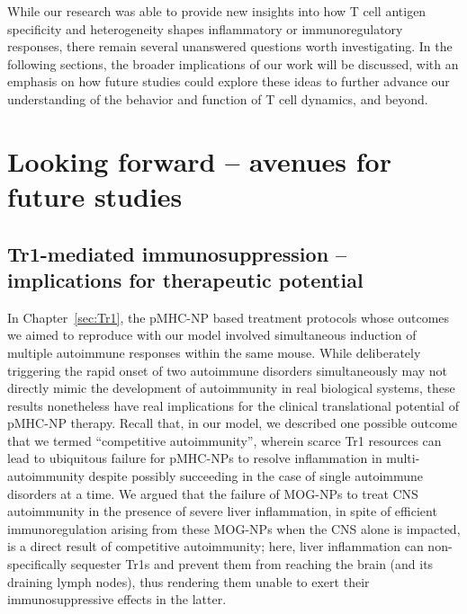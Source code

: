 While our research was able to provide new insights into how T cell antigen specificity and heterogeneity shapes inflammatory or immunoregulatory responses, there remain several unanswered questions worth investigating. In the following sections, the broader implications of our work will be discussed, with an emphasis on how future studies could explore these ideas to further advance our understanding of the behavior and function of T cell dynamics, and beyond.


\section{Looking forward -- avenues for future studies}

\subsection{Tr1-mediated immunosuppression -- implications for therapeutic potential}

In Chapter~\ref{sec:Tr1}, the pMHC-NP based treatment protocols whose outcomes we aimed to reproduce with our model involved simultaneous induction of multiple autoimmune responses within the same mouse. While deliberately triggering the rapid onset of two autoimmune disorders simultaneously may not directly mimic the development of autoimmunity in real biological systems, these results nonetheless have real implications for the clinical translational potential of pMHC-NP therapy. Recall that, in our model, we described one possible outcome that we termed ``competitive autoimmunity'', wherein scarce Tr1 resources can lead to ubiquitous failure for pMHC-NPs to resolve inflammation in multi-autoimmunity despite possibly succeeding in the case of single autoimmune disorders at a time. We argued that the failure of MOG-NPs to treat CNS autoimmunity in the presence of severe liver inflammation, in spite of efficient immunoregulation arising from these MOG-NPs when the CNS alone is impacted, is a direct result of competitive autoimmunity; here, liver inflammation can non-specifically sequester Tr1s and prevent them from reaching the brain (and its draining lymph nodes), thus rendering them unable to exert their immunosuppressive effects in the latter.

